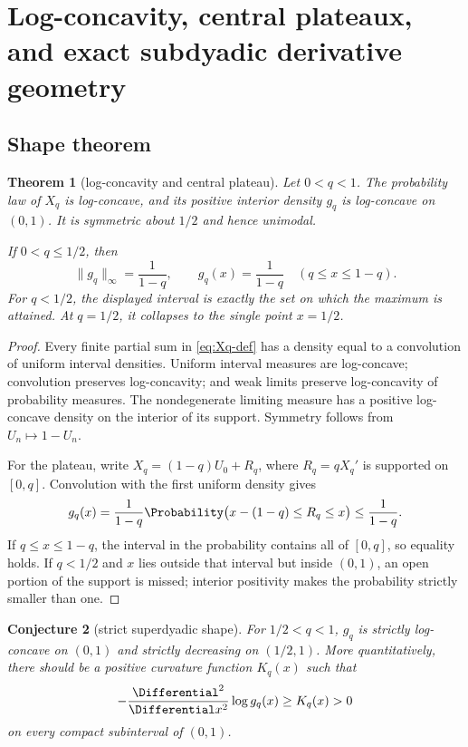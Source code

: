 \documentclass[11pt]{article}
\newtheorem{theorem}{Theorem}[section]
\newtheorem{conjecture}[theorem]{Conjecture}
\theoremstyle{definition}
\theoremstyle{remark}
\begin{document}
\section{Log-concavity, central plateaux, and exact subdyadic derivative geometry}

\subsection{Shape theorem}

\begin{theorem}[log-concavity and central plateau]\label{thm:shape}
Let $0<q<1$.  The probability law of $X_q$ is log-concave, and its positive interior density $g_q$ is log-concave on $(0,1)$.  It is symmetric about $1/2$ and hence unimodal.

If $0<q\le1/2$, then
\begin{equation}\label{eq:plateau}
 \|g_q\|_\infty=\frac1{1-q},
 \qquad
 g_q(x)=\frac1{1-q}\quad(q\le x\le1-q).
\end{equation}
For $q<1/2$, the displayed interval is exactly the set on which the maximum is attained.  At $q=1/2$, it collapses to the single point $x=1/2$.
\end{theorem}

\begin{proof}
Every finite partial sum in \cref{eq:Xq-def} has a density equal to a convolution of uniform interval densities.  Uniform interval measures are log-concave; convolution preserves log-concavity; and weak limits preserve log-concavity of probability measures.  The nondegenerate limiting measure has a positive log-concave density on the interior of its support.  Symmetry follows from $U_n\mapsto1-U_n$.

For the plateau, write $X_q=(1-q)U_0+R_q$, where $R_q=qX_q'$ is supported on $[0,q]$.  Convolution with the first uniform density gives
\[
 g_q(x)=\frac1{1-q}\Probability\bigl(x-(1-q)\le R_q\le x\bigr)
 \le\frac1{1-q}.
\]
If $q\le x\le1-q$, the interval in the probability contains all of $[0,q]$, so equality holds.  If $q<1/2$ and $x$ lies outside that interval but inside $(0,1)$, an open portion of the support is missed; interior positivity makes the probability strictly smaller than one.
\end{proof}

\begin{conjecture}[strict superdyadic shape]\label{conj:strict-logconcavity}
For $1/2<q<1$, $g_q$ is strictly log-concave on $(0,1)$ and strictly decreasing on $(1/2,1)$.  More quantitatively, there should be a positive curvature function $K_q(x)$ such that
\[
 -\frac{\Differential^2}{\Differential x^2}\log g_q(x)\ge K_q(x)>0
\]
on every compact subinterval of $(0,1)$.
\end{conjecture}
\end{document}

